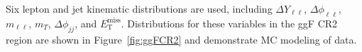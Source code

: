 Six lepton and jet kinematic distributions are used, including $\Delta Y_{\ell\ell}$, $\Delta \phi_{\ell\ell}$, $m_{\ell\ell}$, $m_T$, $\Delta \phi_{jj}$, and $\ensuremath{E_{\text{T}}^{\text{miss}}}$. Distributions for these variables in the ggF CR2 region are shown in Figure~\ref{fig:ggFCR2} and demonstrate MC modeling of data.
\begin{figure}[!h]
  \hfill
  \hfill
  \hfill
  \hfill

\end{figure}
